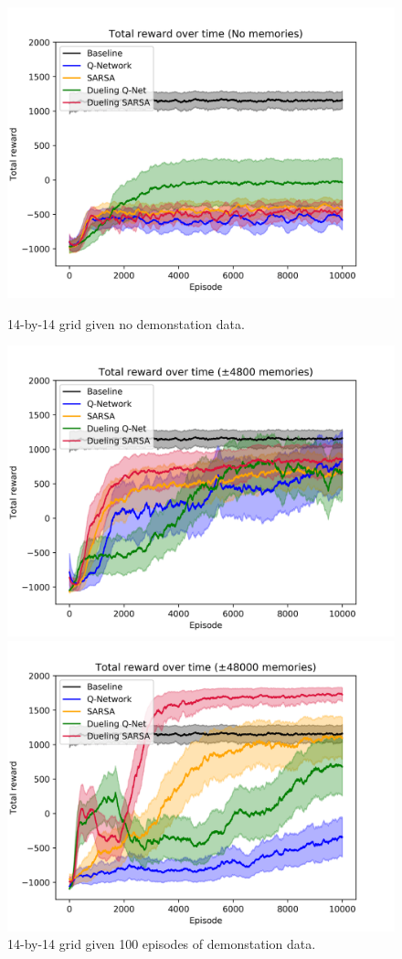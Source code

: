 \begin{figure}[H]
    \centering
    \includegraphics[width=\linewidth]{img/results/14-sized/total_rewards_0m-min.png}
    \caption{14-by-14 grid given no demonstation data.}
    \label{fig:14sized-nomem}
    \includegraphics[width=\linewidth]{img/results/14-sized/total_rewards_100m-min.png}
    \caption{14-by-14 grid given 100 episodes of demonstation data.}
    \label{fig:14sized-100mem}
    \includegraphics[width=\linewidth]{img/results/14-sized/total_rewards_1000m-min.png}

\end{figure}
